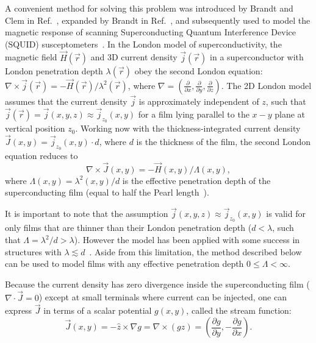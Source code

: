 \documentclass[final,3p,times,twocolumn]{elsarticle}
\newcounter{bla}
\begin{document}
A convenient method for solving this problem was introduced by Brandt and Clem in Ref.~\cite{Brandt2004-ew}, expanded by Brandt in Ref.~\cite{Brandt2005-wj}, and subsequently used to model the magnetic response of scanning Superconducting Quantum Interference Device (SQUID) susceptometers~\cite{Kirtley2016-zz, Kirtley2016-gt}. In the London model of superconductivity, the magnetic field $\vec{H}(\vec{r})$ and 3D current density $\vec{j}(\vec{r})$ in a superconductor with London penetration depth $\lambda(\vec{r})$ obey the second London equation:
$\nabla\times\vec{j}(\vec{r})=-\vec{H}(\vec{r})/\lambda^2(\vec{r})$, where
$\nabla=\left(\frac{\partial}{\partial x}, \frac{\partial}{\partial y}, \frac{\partial}{\partial z}\right)$. The 2D London model assumes that the current density $\vec{j}$ is approximately independent of $z$, such that  $\vec{j}(\vec{r}) = \vec{j}(x, y, z)\approx\vec{j}_{z_0}(x, y)$ for a film lying parallel to the $x-y$ plane at vertical position $z_0$. Working now with the thickness-integrated current density $\vec{J}(x, y)=\vec{j}_{z_0}(x, y)\cdot d$, where $d$
is the thickness of the film, the second London equation reduces to
\begin{equation}
    \label{eq:london}
    \nabla\times\vec{J}(x, y)=-\vec{H}(x, y)/\Lambda(x, y),
\end{equation}
where $\Lambda(x, y)=\lambda^2(x, y)/d$ is the effective penetration depth
of the superconducting film (equal to half the Pearl length~\cite{Pearl1964-cl}).

It is important to note that the assumption $\vec{j}(x, y, z)\approx\vec{j}_{z_0}(x, y)$ is valid for only films that are thinner than their London penetration depth ($d<\lambda$, such that $\Lambda=\lambda^2/d>\lambda$). However the model has been applied with some success in structures with $\lambda\lesssim d$~\cite{Kirtley2016-zz,Kirtley2016-gt}. Aside from this limitation, the method described below can be used to model films with any effective penetration depth $0\leq\Lambda<\infty$.

Because the current density has zero divergence inside the superconducting film ($\nabla\cdot\vec{J}=0$)
except at small terminals where current can be injected, one can express $\vec{J}$ in terms
of a scalar potential $g(x, y)$, called the stream function:
\begin{equation}
    \label{eq:stream}
    \vec{J}(x, y) = -\hat{z}\times\nabla g
    = \nabla\times(g\hat{z})
    = \left(\frac{\partial g}{\partial y}, -\frac{\partial g}{\partial x}\right).
\end{equation}
\end{document}
